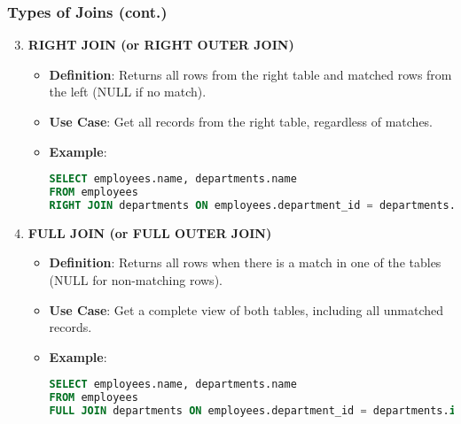 \documentclass[aspectratio=169]{beamer}
\begin{document}
\begin{frame}[fragile]
    \frametitle{Types of Joins (cont.)}

    \begin{enumerate}
        \setcounter{enumi}{2}
        \item \textbf{RIGHT JOIN (or RIGHT OUTER JOIN)}
        \begin{itemize}
            \item \textbf{Definition}: Returns all rows from the right table and matched rows from the left (NULL if no match).
            \item \textbf{Use Case}: Get all records from the right table, regardless of matches.
            \item \textbf{Example}: 
            \begin{lstlisting}[language=SQL]
SELECT employees.name, departments.name 
FROM employees 
RIGHT JOIN departments ON employees.department_id = departments.id;
            \end{lstlisting}
        \end{itemize}

        \item \textbf{FULL JOIN (or FULL OUTER JOIN)}
        \begin{itemize}
            \item \textbf{Definition}: Returns all rows when there is a match in one of the tables (NULL for non-matching rows).
            \item \textbf{Use Case}: Get a complete view of both tables, including all unmatched records.
            \item \textbf{Example}: 
            \begin{lstlisting}[language=SQL]
SELECT employees.name, departments.name 
FROM employees 
FULL JOIN departments ON employees.department_id = departments.id;
            \end{lstlisting}
        \end{itemize}
    \end{enumerate}
\end{frame}
\end{document}
